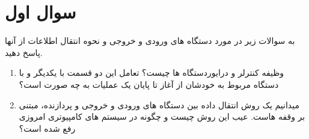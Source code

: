 \section{سوال اول}
به سوالات زیر در مورد دستگاه های ورودی و خروجی و نحوه انتقال اطلاعات از آنها پاسخ دهید.
\begin{enumerate}
	\item 
	وظیفه کنترلر و درایوردستگاه ها چیست؟ تعامل این دو قسمت با یکدیگر و با دستگاه مربوط به خودشان از آغاز تا پایان یک عملیات  به چه صورت است؟
	
	\begin{qsolve}[]
		
	\end{qsolve}
	
	\item 
	میدانیم یک روش انتقال داده بین دستگاه های ورودی و خروجی و پردازنده، مبتنی بر وقفه هاست. عیب این روش چیست و چگونه در سیستم های کامپیوتری امروزی رفع شده است؟
	
	\begin{qsolve}[]
		
	\end{qsolve}
\end{enumerate}


